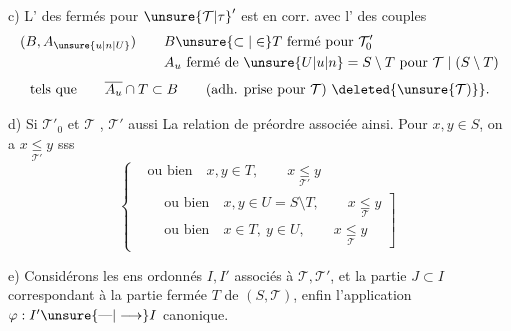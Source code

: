 c) L' des fermés pour ${\unsure{\mathcal{T}|\tau}}'$ est en corr.  avec l' des couples
\[
\begin{aligned}
(B,A_{\unsure{u|n|U}}) \qquad & B\unsure{\subset|\in}T\ \text{fermé pour }\mathcal{T}'_0\\
& A_u\ \text{fermé de }\unsure{U|u|n}=S\setminus T\ \text{pour }\mathcal{T}\mid(S\setminus T)
\end{aligned}
\]
\[
\text{tels que}\qquad \overline{A_u}\cap T\subset B \qquad
\text{(adh. prise pour }\mathcal{T}\text{)}\ \deleted{\unsure{\mathcal{T})}}.
\]

d) Si $\mathcal{T}'_0$ et $\mathcal{T}$ , $\mathcal{T}'$ aussi La relation de préordre associée   ainsi. Pour $x,y\in S$, on a $x\underset{\mathcal{T}'}{\leq}y$ sss
\[
\left\{\begin{aligned}
&\text{ou bien}\quad x,y\in T,\qquad x\underset{\mathcal{T}'}{\leq}y\\
&\left.\begin{aligned}
&\text{ou bien}\quad x,y\in U=S\setminus T,\qquad x\underset{\mathcal{T}}{\leq}y\\
&\text{ou bien}\quad x\in T,\ y\in U,\qquad x\underset{\mathcal{T}}{\leq}y
\end{aligned}\right]
\end{aligned}\right.
\]

e)  Considérons les ens ordonnés $I,I'$ associés à $\mathcal{T},\mathcal{T}'$, et la partie  $J\subset I$ correspondant à la partie fermée $T$ de $(S,\mathcal{T})$, enfin l'application $\varphi:I'\unsure{\mathbin{\text{---}}|\longrightarrow}I$ canonique.

